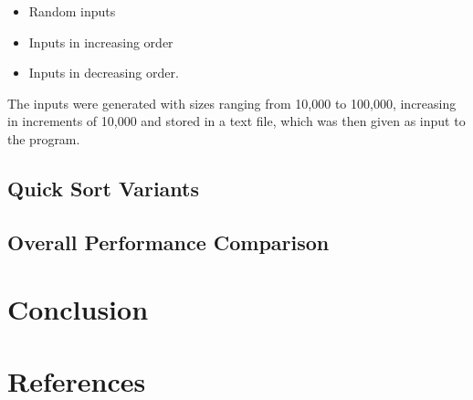 \documentclass[12pt]{article}
\begin{document}
    \begin{itemize}
        \item Random inputs
        \item Inputs in increasing order
        \item Inputs in decreasing order. 
    \end{itemize}

    The inputs were generated with sizes ranging from 10,000 to 100,000, increasing in increments of 10,000 and stored in a text file, which was then given as input to the program.

\subsection{Quick Sort Variants}

\subsection{Overall Performance Comparison}


\section{Conclusion}


\section{References}
\end{document}
